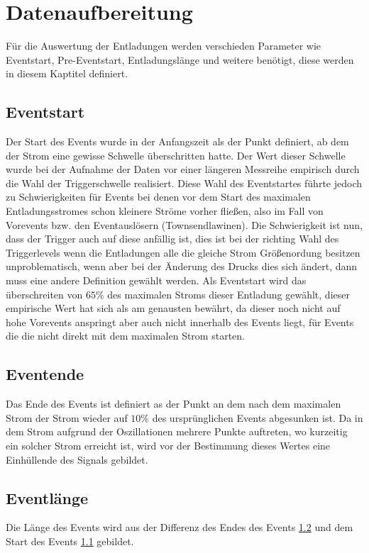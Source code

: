 \chapter{Datenaufbereitung}
\label{chap:features}

Für die Auswertung der Entladungen werden verschieden Parameter wie Eventstart, Pre-Eventstart, Entladungslänge und weitere benötigt, diese werden in diesem Kaptitel definiert.

\section{Eventstart}
\label{sec:eventstart}

Der Start des Events wurde in der Anfangszeit als der Punkt definiert, ab dem der Strom eine gewisse Schwelle überschritten hatte. Der Wert dieser Schwelle wurde bei der Aufnahme der Daten vor einer längeren Messreihe empirisch durch die Wahl der Triggerschwelle realisiert. Diese Wahl des Eventstartes führte jedoch zu Schwierigkeiten für Events bei denen vor dem Start des maximalen Entladungsstromes schon kleinere Ströme vorher fließen, also im Fall von Vorevents bzw. den Eventauslösern (Townsendlawinen). Die Schwierigkeit ist nun, dass der Trigger auch auf diese anfällig ist, dies ist bei der richting Wahl des Triggerlevels wenn die Entladungen alle die gleiche Strom Größenordung besitzen unproblematisch, wenn aber bei der Änderung des Drucks dies sich ändert, dann muss eine andere Definition gewählt werden. Als Eventstart wird das überschreiten von $65 \%$ des maximalen Stroms dieser Entladung gewählt, dieser empirische Wert hat sich als am genausten bewährt, da dieser noch nicht auf hohe Vorevents anspringt aber auch nicht innerhalb des Events liegt, für Events die die nicht direkt mit dem maximalen Strom starten. 

\section{Eventende}
\label{sec:eventende}
Das Ende des Events ist definiert as der Punkt an dem nach dem maximalen Strom der Strom wieder auf \(10\%\) des ursprünglichen Events abgesunken ist. Da in dem Strom aufgrund der Oszillationen mehrere Punkte auftreten, wo kurzeitig ein solcher Strom erreicht ist, wird vor der Bestimmung dieses Wertes eine Einhüllende des Signals gebildet. 

\section{Eventlänge}
\label{sec:eventlen}
Die Länge des Events wird aus der Differenz des Endes des Events \ref{sec:eventende} und dem Start des Events \ref{sec:eventstart} gebildet. 

